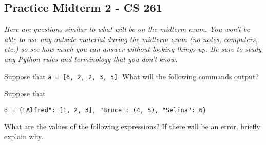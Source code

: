 \documentclass[12pt]{exam}
\begin{document}
\pagestyle{empty}
\graphicspath{{/home/brian/Dropbox/HSC/Spring16/Math111/}}

\subsection*{Practice Midterm 2 - CS 261}
\textit{Here are questions similar to what will be on the midterm exam.  You won't be able to use any outside material during the midterm exam (no notes, computers, etc.) so see how much you can answer without looking things up. Be sure to study any Python rules and terminology that you don't know. }

\begin{questions}

\question Suppose that \verb|a = [6, 2, 2, 3, 5]|. What will the following commands output?  


\question Suppose that 
\begin{center}
\verb|d = {"Alfred": [1, 2, 3], "Bruce": (4, 5), "Selina": 6}|
\end{center}
What are the values of the following expressions? If there will be an error, briefly explain why.


\end{questions}
\end{document}
